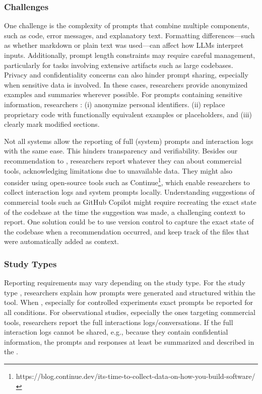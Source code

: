 \subsubsection{Challenges}

One challenge is the complexity of prompts that combine multiple components, such as code, error messages, and explanatory text.
Formatting differences—such as whether markdown or plain text was used—can affect how LLMs interpret inputs.
Additionally, prompt length constraints may require careful management, particularly for tasks involving extensive artifacts such as large codebases.
Privacy and confidentiality concerns can also hinder prompt sharing, especially when sensitive data is involved. In these cases, researchers \should provide anonymized examples and summaries wherever possible.
For prompts containing sensitive information, researchers \must: (i) anonymize personal identifiers. (ii) replace proprietary code with functionally equivalent examples or placeholders, and (iii) clearly mark modified sections.


Not all systems allow the reporting of full (system) prompts and interaction logs with the same ease.
This hinders transparency and verifiability.
Besides our recommendation to \openllm, researchers \should report whatever they can about commercial tools, acknowledging limitations due to unavailable data.
They might also consider using open-source tools such as Continue\footnote{https://blog.continue.dev/its-time-to-collect-data-on-how-you-build-software/}, which enable researchers to collect interaction logs and system prompts locally.
Understanding suggestions of commercial tools such as GitHub Copilot might require recreating the exact state of the codebase at the time the suggestion was made, a challenging context to report.
One solution could be to use version control to capture the exact state of the codebase when a recommendation occurred, and keep track of the files that were automatically added as context.


\subsubsection{Study Types}

Reporting requirements may vary depending on the study type.
For the study type \newtools, researchers \must explain how prompts were generated and structured within the tool.
When \llmusage, especially for controlled experiments exact prompts \must be reported for all conditions.
For observational studies, especially the ones targeting commercial tools, researchers \must report the full interactions logs/conversations.
If the full interaction logs cannot be shared, e.g., because they contain confidential information, the prompts and responses \should at least be summarized and described in the \paper.

